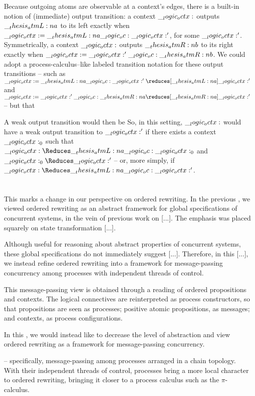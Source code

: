 Because outgoing atoms are observable at a context's edges, there is a built-in notion of (immediate) output transition: a context $\__logic_octx:$ outputs $\__thesis_atmL:n {a}$ to its left exactly when $\__logic_octx: = \__thesis_atmL:n {a} \__logic_oc: \__logic_octx:'$, for some $\__logic_octx:'$.
Symmetrically, a context $\__logic_octx:$ outputs $\__thesis_atmR:n {b}$ to its right exactly when $\__logic_octx: = \__logic_octx:' \__logic_oc: \__thesis_atmR:n {b}$.
We could adopt a process-calculus--like labeled transition notation for these output transitions -- such as $\octx = \atmL{a} \oc \octx' \reduces[\atmL{a}] \octx'$ and $\octx = \octx' \oc \atmR{a} \reduces[\atmR{a}] \octx'$ -- but that 

A weak output transition would then be
So, in this setting, $\__logic_octx:$ would have a weak output transition to $\__logic_octx:'$ if there exists a context $\__logic_octx:_0$ such that $\octx \Reduces \atmL{a} \oc \octx_0$ and $\octx_0 \Reduces \octx'$ -- or, more simply, if $\octx \Reduces \atmL{a} \oc \octx'$.


\section{}

This  marks a change in our perspective on ordered rewriting.
In the previous , we viewed ordered rewriting as an abstract framework for global specifications of concurrent systems, in the vein of previous work on [...].
The emphasis was placed squarely on state transformation [...].

Although useful for reasoning about abstract properties of concurrent systems, these global specifications do not immediately suggest [...].
Therefore, in this [...], we instead refine ordered rewriting into a framework for message-passing concurrency among processes with independent threads of control.

This message-passing view is obtained through a \autocite{??} reading of ordered propositions and contexts.
The logical connectives are reinterpreted as process constructors, so that propositions are seen as processes; positive atomic propositions, as messages; and contexts, as process configurations.

In this , we would instead like to decrease the level of abstraction and view ordered rewriting as a framework for message-passing concurrency.

 -- specifically, message-passing among processes arranged in a chain topology.
With their independent threads of control, processes bring a more local character to ordered rewriting, bringing it closer to a process calculus such as the $\pi$-calculus.

